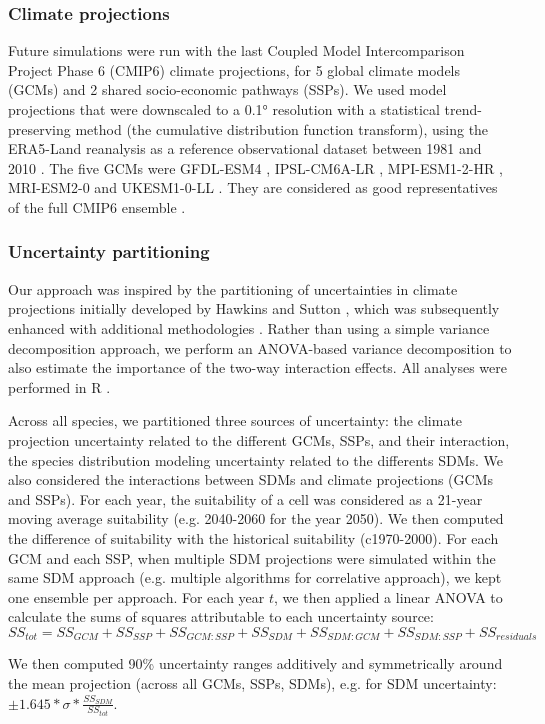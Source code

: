 \documentclass[11pt,letter]{article}
\begin{document}
\subsubsection*{Climate projections}

Future simulations were run with the last Coupled Model Intercomparison Project Phase 6 (CMIP6) climate  projections, for 5 global climate models (GCMs) and 2 shared socio-economic pathways (SSPs). 
We used model projections that were downscaled to a 0.1° resolution with a statistical trend-preserving method (the cumulative distribution function transform), using the ERA5-Land reanalysis as a reference observational dataset between 1981 and 2010 \citep{Noel2022}. The five GCMs were GFDL-ESM4 \citep{Dunne2020}, IPSL-CM6A-LR \citep{Lurton2020}, MPI-ESM1-2-HR \citep{Mueller2018}, MRI-ESM2-0 \citep{Yukimoto2019} and UKESM1-0-LL \citep{Sellar2020}. They are considered as good representatives of the full CMIP6 ensemble \citep{Noel2022}. 

\subsubsection*{Uncertainty partitioning}

Our approach was inspired by the partitioning of uncertainties in climate projections initially developed by Hawkins and Sutton \citep{Hawkins2009, Hawkins2011}, which was subsequently enhanced with additional methodologies \citep{Yip2011, Lafferty2023}. Rather than using a simple variance decomposition approach, we perform an ANOVA-based variance decomposition to also estimate the importance of the two-way interaction effects. All analyses were performed in R \citep{RCT2024}.

Across all species, we partitioned three sources of uncertainty: the climate projection uncertainty related to the different GCMs, SSPs, and their interaction, the species distribution modeling uncertainty related to the differents SDMs. We also considered the interactions between SDMs and climate projections (GCMs and SSPs). For each year, the suitability of a cell was considered as a 21-year moving average suitability (e.g. 2040-2060 for the year 2050). We then computed the difference of suitability with the historical suitability (c1970-2000). For each GCM and each SSP, when multiple SDM projections were simulated within the same SDM approach (e.g. multiple algorithms for correlative approach), we kept one ensemble per approach. For each year $t$, we then applied a linear ANOVA to calculate the sums of squares attributable to each uncertainty source:
$$
{SS}_{tot} = {SS}_{GCM} + {SS}_{SSP} + {SS}_{GCM:SSP} + {SS}_{SDM} + {SS}_{SDM:GCM} + {SS}_{SDM:SSP} + {SS}_{residuals}
$$

We then computed 90\% uncertainty ranges additively and symmetrically around the mean projection (across all GCMs, SSPs, SDMs), e.g. for SDM uncertainty: $\pm1.645*\sigma*\frac{{SS}_{SDM}}{{SS}_{tot}}$.


\clearpage


\end{document}
